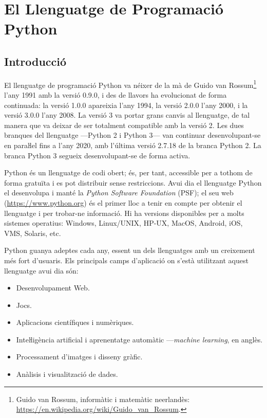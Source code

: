 \chapter{El Llenguatge de Programació Python}\label{chap:python-llenguatge}


\section{Introducció}

El llenguatge de programació Python va néixer de la mà de Guido van Rossum\footnote{Guido van Rossum, informàtic i matemàtic neerlandès: \href{https://en.wikipedia.org/wiki/Guido_van_Rossum}{https:/\!\!/en.wikipedia.org/wiki/Guido\_van\_Rossum}.} l'any 1991 amb la versió 0.9.0, i des de llavors  ha evolucionat de forma continuada: la versió 1.0.0 apareixia l'any 1994, la versió 2.0.0 l'any 2000, i la versió 3.0.0 l'any 2008. La versió 3 va portar grans canvis al llenguatge, de tal manera que va deixar de ser totalment compatible amb la versió 2. Les dues branques del llenguatge ---Python 2 i Python 3--- van continuar desenvolupant-se en paraŀlel fins a l'any 2020, amb l'última versió  2.7.18  de la branca Python 2. La branca Python 3 segueix desenvolupant-se de forma activa.


Python és un llenguatge de codi obert; és, per tant, accessible per a tothom de forma gratuïta i  es pot distribuir sense restriccions.  Avui  dia el llenguatge Python el desenvolupa i manté la \textit{Python Software Foundation} (PSF); el seu web (\href{https://www.python.org/}{https:/\!\!/www.python.org}) és el primer lloc a tenir en compte per obtenir el llenguatge i per trobar-ne informació. Hi ha versions disponibles per a molts sistemes operatius: Windows, Linux/UNIX, HP-UX, MacOS, Android, iOS, VMS, Solaris, etc.

Python guanya adeptes cada any, essent un dels llenguatges amb un creixement més fort d'usuaris. Els principals camps d'aplicació on s'està utilitzant aquest llenguatge avui dia són:
\begin{itemize}
	\item Desenvolupament Web.
	\item Jocs.
	\item Aplicacions científiques i numèriques.
	\item Inteŀligència artificial i aprenentatge automàtic ---\textit{machine learning}, en anglès.
	\item Processament d'imatges i disseny gràfic.
	\item Anàlisis i visualització de dades.
\end{itemize}

